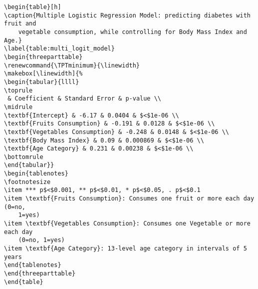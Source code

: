 \documentclass[11pt]{article}
\begin{document}
\begin{Verbatim}[tabsize=4]
\begin{table}[h]
\caption{Multiple Logistic Regression Model: predicting diabetes with fruit and
	vegetable consumption, while controlling for Body Mass Index and Age.}
\label{table:multi_logit_model}
\begin{threeparttable}
\renewcommand{\TPTminimum}{\linewidth}
\makebox[\linewidth]{%
\begin{tabular}{llll}
\toprule
 & Coefficient & Standard Error & p-value \\
\midrule
\textbf{Intercept} & -6.17 & 0.0404 & $<$1e-06 \\
\textbf{Fruits Consumption} & -0.191 & 0.0128 & $<$1e-06 \\
\textbf{Vegetables Consumption} & -0.248 & 0.0148 & $<$1e-06 \\
\textbf{Body Mass Index} & 0.09 & 0.000869 & $<$1e-06 \\
\textbf{Age Category} & 0.231 & 0.00238 & $<$1e-06 \\
\bottomrule
\end{tabular}}
\begin{tablenotes}
\footnotesize
\item *** p$<$0.001, ** p$<$0.01, * p$<$0.05, . p$<$0.1
\item \textbf{Fruits Consumption}: Consumes one fruit or more each day (0=no,
	1=yes)
\item \textbf{Vegetables Consumption}: Consumes one Vegetable or more each day
	(0=no, 1=yes)
\item \textbf{Age Category}: 13-level age category in intervals of 5 years
\end{tablenotes}
\end{threeparttable}
\end{table}

\end{Verbatim}




\end{document}
